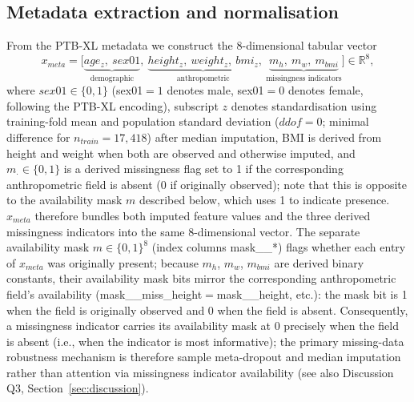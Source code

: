 \documentclass[mathematics,article,pdftex]{Definitions/mdpi}
\def\texttt#1{#1}%
\def\mathrm#1{#1}%
\def\mathbf#1{#1}%
\def\emph#1{#1}%
\begin{document}
\subsection{Metadata extraction and normalisation}
From the PTB-XL metadata we construct the 8-dimensional tabular vector
\begin{equation}\label{eq:xmeta}
\mathbf{x}_{\mathrm{meta}}
= \bigl[\underbrace{\mathrm{age}_z,\ \mathrm{sex01}}_{\text{demographic}},\
         \underbrace{\mathrm{height}_z,\ \mathrm{weight}_z,\ \mathrm{bmi}_z}_{\text{anthropometric}},\
         \underbrace{m_h,\ m_w,\ m_{\mathrm{bmi}}}_{\text{missingness indicators}}\bigr]
\in \mathbb{R}^{8},
\end{equation}
where $\mathrm{sex01}\in\{0,1\}$ (sex01$=1$ denotes male, sex01$=0$ denotes female, following the PTB-XL encoding), subscript $z$ denotes standardisation using training-fold mean and population standard deviation ($\mathrm{ddof}{=}0$; minimal difference for $n_{\mathrm{train}}{=}17{,}418$) after median imputation, BMI is derived from height and weight when both are observed and otherwise imputed, and $m_{\cdot}\in\{0,1\}$ is a derived missingness flag set to 1 if the corresponding anthropometric field is absent (0 if originally observed); note that this is opposite to the availability mask $\mathbf{m}$ described below, which uses 1 to indicate presence. $\mathbf{x}_{\mathrm{meta}}$ therefore bundles both imputed feature values \emph{and} the three derived missingness indicators into the same 8-dimensional vector. The separate availability mask $\mathbf{m}\in\{0,1\}^{8}$ (index columns \texttt{mask\_\_*}) flags whether each entry of $\mathbf{x}_{\mathrm{meta}}$ was originally present; because $m_h$, $m_w$, $m_{\mathrm{bmi}}$ are derived binary constants, their availability mask bits mirror the corresponding anthropometric field's availability (\texttt{mask\_\_miss\_height}$=$\texttt{mask\_\_height}, etc.): the mask bit is 1 when the field is originally observed and 0 when the field is absent. Consequently, a missingness indicator carries its availability mask at 0 precisely when the field is absent (i.e., when the indicator is most informative); the primary missing-data robustness mechanism is therefore sample meta-dropout and median imputation rather than attention via missingness indicator availability (see also Discussion Q3, Section~\ref{sec:discussion}).
\end{document}
